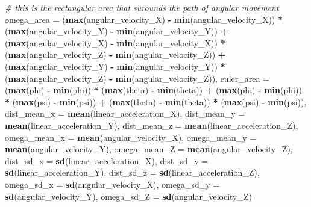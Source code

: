 \documentclass[]{article}
\newenvironment{Shaded}{\begin{snugshade}}{\end{snugshade}}
\newcommand{\CommentTok}[1]{\textcolor[rgb]{0.56,0.35,0.01}{\textit{#1}}}
\newcommand{\DataTypeTok}[1]{\textcolor[rgb]{0.13,0.29,0.53}{#1}}
\newcommand{\KeywordTok}[1]{\textcolor[rgb]{0.13,0.29,0.53}{\textbf{#1}}}
\newcommand{\NormalTok}[1]{#1}
\newcommand{\OperatorTok}[1]{\textcolor[rgb]{0.81,0.36,0.00}{\textbf{#1}}}
\newcommand{\StringTok}[1]{\textcolor[rgb]{0.31,0.60,0.02}{#1}}
\begin{document}
\begin{Shaded}
\begin{Highlighting}[]
{{        \CommentTok{# this is the rectangular area that surounds the path of angular movement}
        \DataTypeTok{omega_area =}\NormalTok{ (}\KeywordTok{max}\NormalTok{(angular_velocity_X) }\OperatorTok{-}\StringTok{ }\KeywordTok{min}\NormalTok{(angular_velocity_X)) }\OperatorTok{*}\StringTok{ }\NormalTok{(}\KeywordTok{max}\NormalTok{(angular_velocity_Y) }\OperatorTok{-}\StringTok{ }\KeywordTok{min}\NormalTok{(angular_velocity_Y)) }\OperatorTok{+}
\StringTok{            }\NormalTok{(}\KeywordTok{max}\NormalTok{(angular_velocity_X) }\OperatorTok{-}\StringTok{ }\KeywordTok{min}\NormalTok{(angular_velocity_X)) }\OperatorTok{*}\StringTok{ }\NormalTok{(}\KeywordTok{max}\NormalTok{(angular_velocity_Z) }\OperatorTok{-}\StringTok{ }\KeywordTok{min}\NormalTok{(angular_velocity_Z)) }\OperatorTok{+}
\StringTok{            }\NormalTok{(}\KeywordTok{max}\NormalTok{(angular_velocity_Y) }\OperatorTok{-}\StringTok{ }\KeywordTok{min}\NormalTok{(angular_velocity_Y)) }\OperatorTok{*}\StringTok{ }\NormalTok{(}\KeywordTok{max}\NormalTok{(angular_velocity_Z) }\OperatorTok{-}\StringTok{ }\KeywordTok{min}\NormalTok{(angular_velocity_Z)),}
        \DataTypeTok{euler_area =}\NormalTok{ (}\KeywordTok{max}\NormalTok{(phi) }\OperatorTok{-}\StringTok{ }\KeywordTok{min}\NormalTok{(phi)) }\OperatorTok{*}\StringTok{ }\NormalTok{(}\KeywordTok{max}\NormalTok{(theta) }\OperatorTok{-}\StringTok{ }\KeywordTok{min}\NormalTok{(theta)) }\OperatorTok{+}\StringTok{ }
\StringTok{            }\NormalTok{(}\KeywordTok{max}\NormalTok{(phi) }\OperatorTok{-}\StringTok{ }\KeywordTok{min}\NormalTok{(phi)) }\OperatorTok{*}\StringTok{ }\NormalTok{(}\KeywordTok{max}\NormalTok{(psi) }\OperatorTok{-}\StringTok{ }\KeywordTok{min}\NormalTok{(psi)) }\OperatorTok{+}\StringTok{ }
\StringTok{            }\NormalTok{(}\KeywordTok{max}\NormalTok{(theta) }\OperatorTok{-}\StringTok{ }\KeywordTok{min}\NormalTok{(theta)) }\OperatorTok{*}\StringTok{ }\NormalTok{(}\KeywordTok{max}\NormalTok{(psi) }\OperatorTok{-}\StringTok{ }\KeywordTok{min}\NormalTok{(psi)),}
        \DataTypeTok{dist_mean_x =} \KeywordTok{mean}\NormalTok{(linear_acceleration_X),}
        \DataTypeTok{dist_mean_y =} \KeywordTok{mean}\NormalTok{(linear_acceleration_Y),}
        \DataTypeTok{dist_mean_z =} \KeywordTok{mean}\NormalTok{(linear_acceleration_Z),}
        \DataTypeTok{omega_mean_x =} \KeywordTok{mean}\NormalTok{(angular_velocity_X),}
        \DataTypeTok{omega_mean_y =} \KeywordTok{mean}\NormalTok{(angular_velocity_Y),}
        \DataTypeTok{omega_mean_Z =} \KeywordTok{mean}\NormalTok{(angular_velocity_Z),}
        \DataTypeTok{dist_sd_x =} \KeywordTok{sd}\NormalTok{(linear_acceleration_X),}
        \DataTypeTok{dist_sd_y =} \KeywordTok{sd}\NormalTok{(linear_acceleration_Y),}
        \DataTypeTok{dist_sd_z =} \KeywordTok{sd}\NormalTok{(linear_acceleration_Z),}
        \DataTypeTok{omega_sd_x =} \KeywordTok{sd}\NormalTok{(angular_velocity_X),}
        \DataTypeTok{omega_sd_y =} \KeywordTok{sd}\NormalTok{(angular_velocity_Y),}
        \DataTypeTok{omega_sd_Z =} \KeywordTok{sd}\NormalTok{(angular_velocity_Z) }
        
}}
\end{Highlighting}
\end{Shaded}
\end{document}
